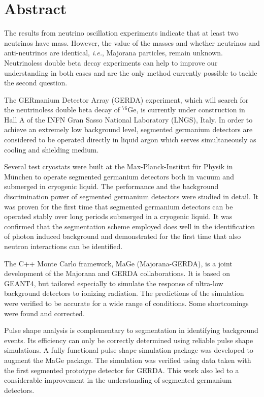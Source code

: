 \section*{Abstract} 
The results from neutrino oscillation experiments indicate that at
least two neutrinos have mass. However, the value of the masses and
whether neutrinos and anti-neutrinos are identical, \textit{i.e.},
Majorana particles, remain unknown. Neutrinoless double beta decay
experiments can help to improve our understanding in both cases and
are the only method currently possible to tackle the second question.
 
The GERmanium Detector Array (GERDA) experiment, which will search for
the neutrinoless double beta decay of $^{76}$Ge, is currently under
construction in Hall A of the INFN Gran Sasso National Laboratory
(LNGS), Italy. In order to achieve an extremely low background level,
segmented germanium detectors are considered to be operated directly
in liquid argon which serves simultaneously as cooling and shielding
medium.
 
Several test cryostats were built at the Max-Planck-Institut f\"ur
Physik in M\"unchen to operate segmented germanium detectors both in
vacuum and submerged in cryogenic liquid. The performance and the
background discrimination power of segmented germanium detectors were
studied in detail. It was proven for the first time that segmented
germanium detectors can be operated stably over long periods submerged
in a cryogenic liquid. It was confirmed that the segmentation scheme
employed does well in the identification of photon induced background
and demonstrated for the first time that also neutron interactions can
be identified.
 
The C++ Monte Carlo framework, MaGe (Majorana-GERDA), is a joint
development of the Majorana and GERDA collaborations. It is based on
GEANT4, but tailored especially to simulate the response of ultra-low
background detectors to ionizing radiation. The predictions of the
simulation were verified to be accurate for a wide range of
conditions. Some shortcomings were found and corrected.
 
Pulse shape analysis is complementary to segmentation in identifying
background events.  Its efficiency can only be correctly determined
using reliable pulse shape simulations.  A fully functional pulse
shape simulation package was developed to augment the MaGe
package. The simulation was verified using data taken with the first
segmented prototype detector for GERDA. This work also led to a
considerable improvement in the understanding of segmented germanium
detectors.
 

